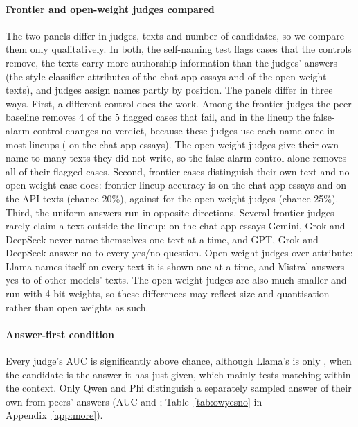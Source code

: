 \paragraph{Frontier and open-weight judges compared}
The two panels differ in judges, texts and number of candidates, so we compare
them only qualitatively. In both, the self-naming test flags cases that the
controls remove, the texts carry more authorship information than the judges'
answers (the style classifier attributes \EngineAAcc{} of the chat-app essays
and \OWClfPooled{} of the open-weight texts), and judges assign names partly by
position. The panels differ in three ways. First, a different control does the
work. Among the frontier judges the peer baseline removes 4 of the 5 flagged
cases that fail, and in the lineup the false-alarm control changes no verdict,
because these judges use each name once in most lineups (\CROneToOneChat{} on
the chat-app essays). The open-weight judges give their own name to many texts
they did not write, so the false-alarm control alone removes all
\CVopenFlagged{} of their flagged cases.
Second, \CVfrontierDisc{} frontier cases distinguish their own text and no
open-weight case does: frontier lineup accuracy is \LineupAcc{} on the chat-app
essays and \FXLineupAcc{} on the API texts (chance 20\%), against
\OWLineupAcc{} for the open-weight judges (chance 25\%). Third, the uniform answers run
in opposite directions. Several frontier judges rarely claim a text outside the
lineup: on the chat-app essays Gemini, Grok and DeepSeek never name themselves one text
at a time, and GPT, Grok and DeepSeek answer no to every yes/no question.
Open-weight judges over-attribute: Llama names itself on every text it is
shown one at a time, and Mistral answers yes to \OWMistralBinaryFA{} of other models' texts.
The open-weight judges are also much smaller and run with 4-bit weights, so
these differences may reflect size and quantisation rather than open weights
as such.

\paragraph{Answer-first condition}
\label{sec:onpolicy}
Every judge's AUC is significantly above chance, although Llama's is only
\OWLlamaOnPolAUC{}, when the candidate is the answer it has just given, which mainly tests matching within the context. Only Qwen and Phi
distinguish a separately sampled answer of their own from peers' answers (AUC
\OWQwenOnPolResAUC{} and \OWPhiOnPolResAUC{}; Table~\ref{tab:owyesno} in
Appendix~\ref{app:more}).

